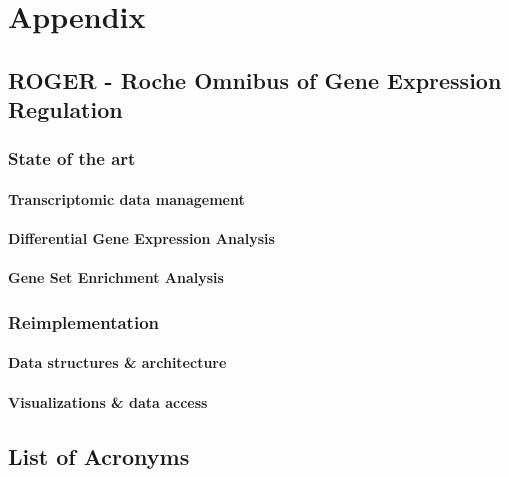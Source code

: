 \documentclass{thesisclass}
\begin{document}

\cleardoublepage

\appendix

\chapter{Appendix}
\label{ch:appendix}


\section{ROGER - Roche Omnibus of Gene Expression Regulation}

\subsection{State of the art}

\subsubsection{Transcriptomic data management}

\subsubsection{Differential Gene Expression Analysis}

\subsubsection{Gene Set Enrichment Analysis}

\subsection{Reimplementation}

\subsubsection{Data structures \& architecture}

\subsubsection{Visualizations \& data access}

\section{List of Acronyms}
\renewcommand{\glossarysection}[2][]{}
\printglossaries
\end{document}
